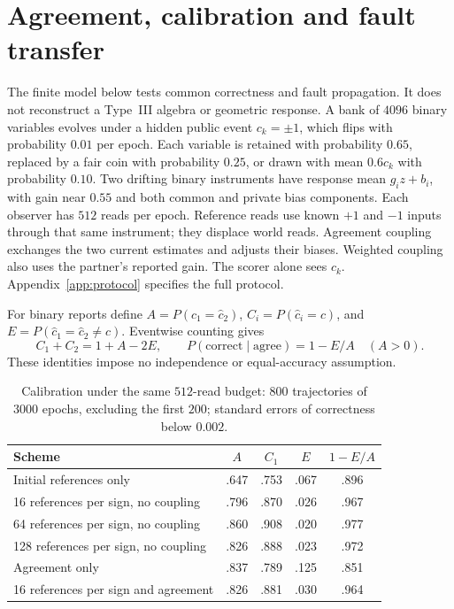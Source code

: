 \section{Agreement, calibration and fault transfer}\label{sec:model}

The finite model below tests common correctness and fault propagation.
It does not reconstruct a Type~III algebra or geometric response.
A bank of \(4096\) binary variables evolves under a hidden public
event \(c_k=\pm1\), which flips with probability \(0.01\) per epoch.
Each variable is retained with probability \(0.65\), replaced by a fair
coin with probability \(0.25\), or drawn with mean \(0.6c_k\) with
probability \(0.10\). Two drifting binary instruments have response
mean \(g_i z+b_i\), with gain near \(0.55\) and both common and
private bias components. Each observer has \(512\) reads per epoch.
Reference reads use known \(+1\) and \(-1\) inputs through that same
instrument; they displace world reads. Agreement coupling exchanges
the two current estimates and adjusts their biases. Weighted coupling
also uses the partner's reported gain. The scorer alone sees \(c_k\).
Appendix~\ref{app:protocol} specifies the full protocol.

For binary reports define \(A=P(\hat c_1=\hat c_2)\),
\(C_i=P(\hat c_i=c)\), and
\(E=P(\hat c_1=\hat c_2\ne c)\). Eventwise counting gives
\[
 C_1+C_2=1+A-2E,\qquad
 P(\text{correct}\mid\text{agree})=1-E/A\quad(A>0).
\]
These identities impose no independence or equal-accuracy assumption.

\begin{table}[htbp]
\centering
\begin{tabular}{lcccc}
\hline
Scheme & \(A\) & \(C_1\) & \(E\) & \(1-E/A\)\\
\hline
Initial references only & .647 & .753 & .067 & .896\\
16 references per sign, no coupling & .796 & .870 & .026 & .967\\
64 references per sign, no coupling & .860 & .908 & .020 & .977\\
128 references per sign, no coupling & .826 & .888 & .023 & .972\\
Agreement only & .837 & .789 & .125 & .851\\
16 references per sign and agreement & .826 & .881 & .030 & .964\\
\hline
\end{tabular}
\caption{Calibration under the same \(512\)-read budget: \(800\)
trajectories of \(3000\) epochs, excluding the first \(200\);
standard errors of correctness below \(0.002\).}
\label{tab:agree}
\end{table}


